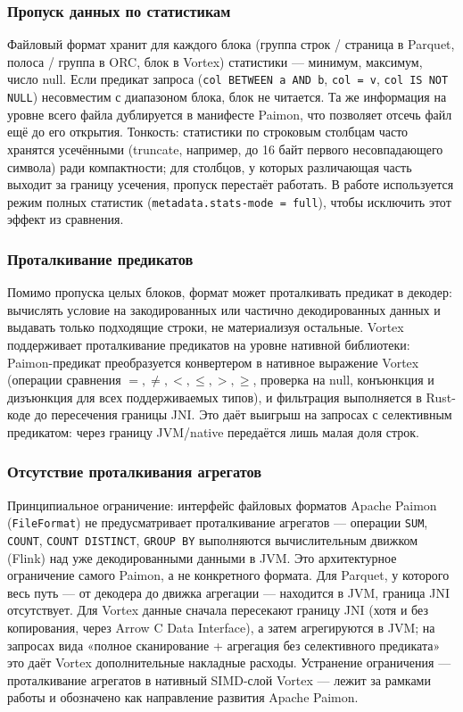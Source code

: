 \subsubsection{Пропуск данных по статистикам}

Файловый формат хранит для каждого блока (группа строк / страница в Parquet, полоса
/ группа в ORC, блок в Vortex) статистики --- минимум, максимум, число null. Если
предикат запроса (\texttt{col BETWEEN a AND b}, \texttt{col = v}, \texttt{col IS
NOT NULL}) несовместим с диапазоном блока, блок не читается. Та же информация на
уровне всего файла дублируется в манифесте Paimon, что позволяет отсечь файл ещё
до его открытия. Тонкость: статистики по строковым столбцам часто хранятся
усечёнными (truncate, например, до 16 байт первого несовпадающего символа) ради
компактности; для столбцов, у которых различающая часть выходит за границу усечения,
пропуск перестаёт работать. В работе используется режим полных статистик
(\texttt{metadata.stats-mode = full}), чтобы исключить этот эффект из сравнения.

\subsubsection{Проталкивание предикатов}

Помимо пропуска целых блоков, формат может проталкивать предикат в декодер:
вычислять условие на закодированных или частично декодированных данных и выдавать
только подходящие строки, не материализуя остальные. Vortex поддерживает
проталкивание предикатов на уровне нативной библиотеки: Paimon-предикат
преобразуется конвертером в нативное выражение Vortex (операции сравнения
\(=, \ne, <, \le, >, \ge\), проверка на null, конъюнкция и дизъюнкция для всех
поддерживаемых типов), и фильтрация выполняется в Rust-коде до пересечения границы
JNI. Это даёт выигрыш на запросах с селективным предикатом: через границу JVM/native
передаётся лишь малая доля строк.

\subsubsection{Отсутствие проталкивания агрегатов}

Принципиальное ограничение: интерфейс файловых форматов Apache Paimon
(\texttt{FileFormat}) не предусматривает проталкивание агрегатов --- операции
\texttt{SUM}, \texttt{COUNT}, \texttt{COUNT DISTINCT}, \texttt{GROUP BY}
выполняются вычислительным движком (Flink) над уже декодированными данными в JVM.
Это архитектурное ограничение самого Paimon, а не конкретного формата. Для Parquet,
у которого весь путь --- от декодера до движка агрегации --- находится в JVM,
граница JNI отсутствует. Для Vortex данные сначала пересекают границу JNI (хотя и
без копирования, через Arrow C Data Interface), а затем агрегируются в JVM; на
запросах вида «полное сканирование + агрегация без селективного предиката» это
даёт Vortex дополнительные накладные расходы. Устранение ограничения ---
проталкивание агрегатов в нативный SIMD-слой Vortex --- лежит за рамками работы и
обозначено как направление развития Apache Paimon.

